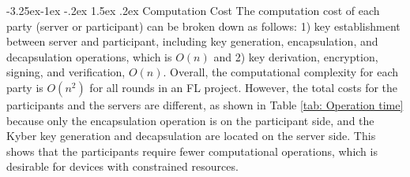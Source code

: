 \documentclass[a4paper,fleqn]{cas-dc}
\makeatletter
\renewcommand\subsection{\@startsection{subsection}{2}{\z@}%
   {-3.25ex\@plus -1ex \@minus -.2ex}%
   {1.5ex \@plus .2ex}%
   {\normalfont\large}} %
\makeatother
\begin{document}
\subsection{Computation Cost}
The computation cost of each party (server or participant) can be broken down as follows: 1) key establishment between server and participant, including key generation, encapsulation, and decapsulation operations, which is $O(n)$ and 2) key derivation, encryption, signing, and verification, $O(n)$. 
Overall, the computational complexity for each party is $O(n^2)$ for all rounds in an FL project. 
However, the total costs for the participants and the servers are different, as shown in Table \ref{tab: Operation time} because only the encapsulation operation is on the participant side, and the Kyber key generation and decapsulation are located on the server side. 
This shows that the participants require fewer computational operations, which is desirable for devices with constrained resources.
\end{document}
